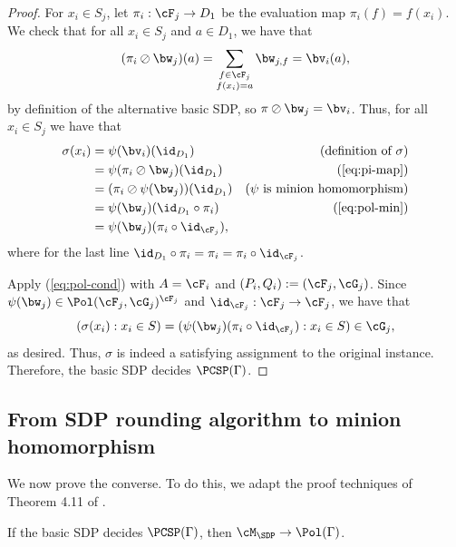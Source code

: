 {\begin{proof}
For $x_i \in S_j$, let $\pi_i : \cF_j \to D_1$ be the evaluation map $\pi_i(f) = f(x_i)$. We check that for all $x_i \in S_j$ and $a \in D_1$, we have that
\begin{align}
(\pi_i \oslash \bw_{j})(a) = \sum_{\substack{f \in \cF_j\\f(x_i) = a}} \bw_{j,f} = \bv_{i}(a),\label{eq:pi-map}
\end{align}
by definition of the alternative basic SDP, so $\pi \oslash \bw_j = \bv_i$. Thus, for all $x_i \in S_j$ we have that
\begin{align*}
    \sigma(x_i) &= \psi(\bv_i)(\id_{D_1}) & \text{(definition of $\sigma$)}\\
    &= \psi(\pi_i \oslash \bw_j)(\id_{D_1})  & \text{(\ref{eq:pi-map})}\\
    &= (\pi_i \oslash \psi(\bw_j))(\id_{D_1}) & \text{($\psi$ is minion homomorphism)}\\
    &= \psi(\bw_j)(\id_{D_1} \circ \pi_i) & \text{(\ref{eq:pol-min})}\\
    &= \psi(\bw_j)(\pi_i \circ \id_{\cF_j}),
\end{align*}
where for the last line $\id_{D_1} \circ \pi_i = \pi_i = \pi_i \circ \id_{\cF_j}$.

Apply (\ref{eq:pol-cond}) with $A = \cF_i$ and $(P_i, Q_i) := (\cF_j, \cG_j)$. Since $\psi(\bw_j) \in \Pol(\cF_j, \cG_j)^{\cF_j}$ and $\id_{\cF_j} : \cF_j \to \cF_j$, we have that
\[
    (\sigma(x_i) : x_i \in S) = (\psi(\bw_j)(\pi_i \circ \id_{\cF_j}) : x_i \in S) \in \cG_j,
\]
as desired. Thus, $\sigma$ is indeed a satisfying assignment to the original instance. Therefore, the basic SDP decides $\PCSP(\Gamma)$.
\end{proof}
}

\subsection{From SDP rounding algorithm to minion homomorphism}
We now prove the converse. {To do this, we adapt} the proof techniques of {Theorem 4.11 of }\cite{ciardo2022clap}. 

\begin{theorem}
If the basic SDP decides $\PCSP({\Gamma})$, then $\cM_{\SDP} \to \Pol({\Gamma})$.
\end{theorem}

